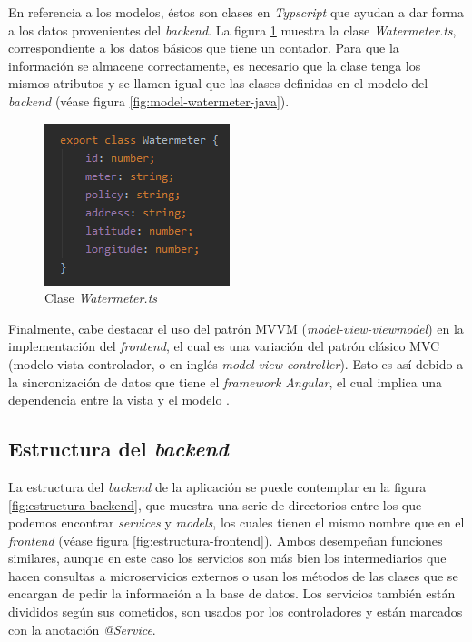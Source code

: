\documentclass[pdftex,11pt,a4paper]{book}
\begin{document}
En referencia a los modelos, éstos son clases en \textit{Typscript} que ayudan a dar forma a los datos provenientes del \textit{backend}. La figura \ref{fig:model-watermeter} muestra la clase \textit{Watermeter.ts}, correspondiente a los datos básicos que tiene un contador. Para que la información se almacene correctamente, es necesario que la clase tenga los mismos atributos y se llamen igual que las clases definidas en el modelo del \textit{backend} (véase figura \ref{fig:model-watermeter-java}).


 \begin{figure}[h]
 \centering
 \includegraphics [scale=0.72] {images/implementacion/watermeter-model.png}
 \caption{Clase \textit{Watermeter.ts}} \label{fig:model-watermeter}
 \end{figure}
 

Finalmente, cabe destacar el uso del patrón MVVM (\textit{model-view-viewmodel}) en la implementación del \textit{frontend}, el cual es una variación del patrón clásico MVC (modelo-vista-controlador, o en inglés \textit{model-view-controller}). Esto es así debido a la sincronización de datos que tiene el \textit{framework Angular}, el cual implica una dependencia entre la vista y el modelo \cite{bib:angular-MVC}.



\subsection{Estructura del \textit{backend}}

La estructura del \textit{backend} de la aplicación se puede contemplar en la figura \ref{fig:estructura-backend}, que muestra una serie de directorios entre los que podemos encontrar \textit{services} y \textit{models}, los cuales tienen el mismo nombre que en el \textit{frontend} (véase figura \ref{fig:estructura-frontend}). Ambos desempeñan funciones similares, aunque en este caso los servicios son más bien los intermediarios que hacen consultas a microservicios externos o usan los métodos de las clases que se encargan de pedir la información a la base de datos. Los servicios también están divididos según sus cometidos, son usados por los controladores y están marcados con la anotación \textit{@Service}.
\end{document}
